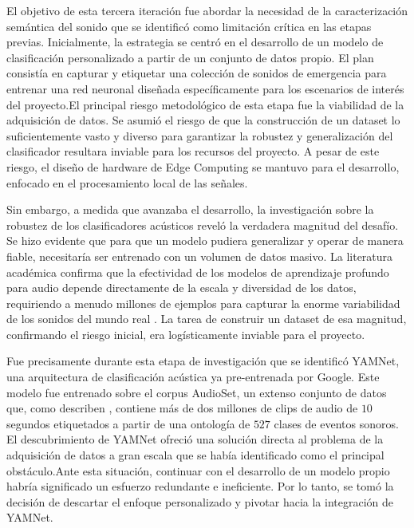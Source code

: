 

El objetivo de esta tercera iteración fue abordar la necesidad de la caracterización semántica del sonido que se identificó como limitación crítica en las etapas previas. Inicialmente, la estrategia se centró en el desarrollo de un modelo de clasificación personalizado a partir de un conjunto de datos propio. El plan consistía en capturar y etiquetar una colección de sonidos de emergencia para entrenar una red neuronal diseñada específicamente para los escenarios de interés del proyecto.El principal riesgo metodológico de esta etapa fue la viabilidad de la adquisición de datos. Se asumió el riesgo de que la construcción de un dataset lo suficientemente vasto y diverso para garantizar la robustez y generalización del clasificador resultara inviable para los recursos del proyecto. A pesar de este riesgo, el diseño de hardware de Edge Computing se mantuvo para el desarrollo, enfocado en el procesamiento local de las señales.

Sin embargo, a medida que avanzaba el desarrollo, la investigación sobre la robustez de los clasificadores acústicos reveló la verdadera magnitud del desafío. Se hizo evidente que para que un modelo pudiera generalizar y operar de manera fiable, necesitaría ser entrenado con un volumen de datos masivo. La literatura académica confirma que la efectividad de los modelos de aprendizaje profundo para audio depende directamente de la escala y diversidad de los datos, requiriendo a menudo millones de ejemplos para capturar la enorme variabilidad de los sonidos del mundo real \cite{gemmeke2017audio}. La tarea de construir un dataset de esa magnitud, confirmando el riesgo inicial, era logísticamente inviable para el proyecto.

Fue precisamente durante esta etapa de investigación que se identificó YAMNet, una arquitectura de clasificación acústica ya pre-entrenada por Google. Este modelo fue entrenado sobre el corpus AudioSet, un extenso conjunto de datos que, como describen \citeauthor{gemmeke2017audio} \citeyear{gemmeke2017audio}, contiene más de dos millones de clips de audio de $10$ segundos etiquetados a partir de una ontología de $527$ clases de eventos sonoros. El descubrimiento de YAMNet ofreció una solución directa al problema de la adquisición de datos a gran escala que se había identificado como el principal obstáculo.Ante esta situación, continuar con el desarrollo de un modelo propio habría significado un esfuerzo redundante e ineficiente. Por lo tanto, se tomó la decisión de descartar el enfoque personalizado y pivotar hacia la integración de YAMNet. 

